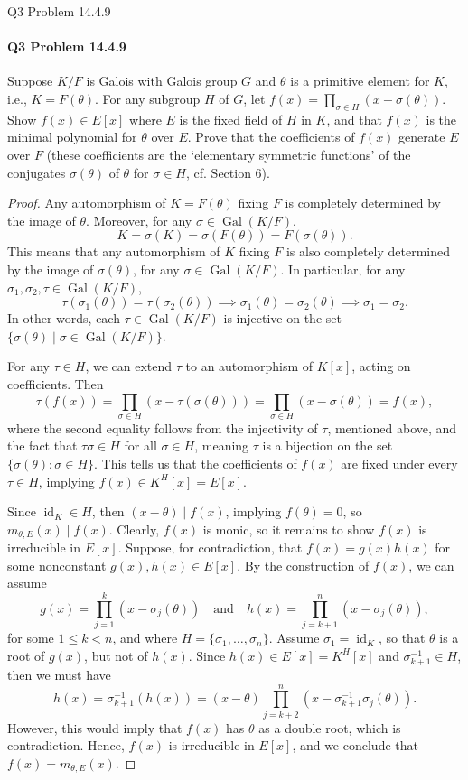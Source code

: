 \documentclass[12pt]{article}
\newenvironment{fullbox}{\begin{lrbox}{\savefullbox}\begin{minipage}{\dimexpr\textwidth-2\fboxsep\relax}}{\end{minipage}\end{lrbox}\begin{center}\framebox[\textwidth]{\usebox{\savefullbox}}\end{center}}
\newenvironment{pbox}[1][]{\begin{fullbox}\ifx#1\empty\else\paragraph{#1}\fi}{\end{fullbox}}
\newcommand{\isp}[1]{\quad\text{#1}\quad}
\newcommand{\<}{\langle}
\renewcommand{\>}{\rangle}
\DeclareMathOperator{\id}{id}
\DeclareMathOperator{\Gal}{Gal}
\begin{document}
\newpage
\begin{pbox}[Q3 Problem 14.4.9]
    Suppose $K/F$ is Galois with Galois group $G$ and $\theta$ is a primitive element for $K$, i.e., $K = F(\theta)$. For any subgroup $H$ of $G$, let $f(x) = \prod_{\sigma \in H}(x - \sigma(\theta))$. Show $f(x) \in E[x]$ where $E$ is the fixed field of $H$ in $K$, and that $f(x)$ is the minimal polynomial for $\theta$ over $E$. Prove that the coefficients of $f(x)$ generate $E$ over $F$ (these coefficients are the `elementary symmetric functions' of the conjugates $\sigma(\theta)$ of $\theta$ for $\sigma \in H$, cf. Section 6).
\end{pbox}

\begin{proof}
    Any automorphism of $K = F(\theta)$ fixing $F$ is completely determined by the image of $\theta$. Moreover, for any $\sigma \in \Gal(K/F)$,
    \[
        K = \sigma(K) = \sigma(F(\theta)) = F(\sigma(\theta)).
    \]
    This means that any automorphism of $K$ fixing $F$ is also completely determined by the image of $\sigma(\theta)$, for any $\sigma \in \Gal(K/F)$. In particular, for any $\sigma_1, \sigma_2, \tau \in \Gal(K/F)$,
    \[
        \tau(\sigma_1(\theta)) = \tau(\sigma_2(\theta)) \implies \sigma_1(\theta) = \sigma_2(\theta) \implies \sigma_1 = \sigma_2.
    \]
    In other words, each $\tau \in \Gal(K/F)$ is injective on the set $\{\sigma(\theta) \mid \sigma \in \Gal(K/F)\}$.

    For any $\tau \in H$, we can extend $\tau$ to an automorphism of $K[x]$, acting on coefficients. Then
    \[
        \tau(f(x)) = \prod_{\sigma \in H} (x - \tau(\sigma(\theta))) = \prod_{\sigma \in H} (x - \sigma(\theta)) = f(x),
    \]
    where the second equality follows from the injectivity of $\tau$, mentioned above, and the fact that $\tau\sigma \in H$ for all $\sigma \in H$, meaning $\tau$ is a bijection on the set $\{\sigma(\theta) : \sigma \in H\}$. This tells us that the coefficients of $f(x)$ are fixed under every $\tau \in H$, implying $f(x) \in K^H[x] = E[x]$.

    Since $\id_K \in H$, then $(x - \theta) \mid f(x)$, implying $f(\theta) = 0$, so $m_{\theta, E}(x) \mid f(x)$. Clearly, $f(x)$ is monic, so it remains to show $f(x)$ is irreducible in $E[x]$. Suppose, for contradiction, that $f(x) = g(x)h(x)$ for some nonconstant $g(x), h(x) \in E[x]$. By the construction of $f(x)$, we can assume
    \[
        g(x) = \prod_{j=1}^{k} (x - \sigma_j(\theta)) \isp{and} h(x) = \prod_{j=k+1}^{n} (x - \sigma_j(\theta)),
    \]
    for some $1 \leq k < n$, and where $H = \{\sigma_1, \dots, \sigma_n\}$. Assume $\sigma_1 = \id_K$, so that $\theta$ is a root of $g(x)$, but not of $h(x)$. Since $h(x) \in E[x] = K^H[x]$ and $\sigma_{k+1}^{-1} \in H$, then we must have
    \[
        h(x) = \sigma_{k+1}^{-1}(h(x)) = (x - \theta)\prod_{j=k+2}^{n} (x - \sigma_{k+1}^{-1}\sigma_j(\theta)).
    \]
    However, this would imply that $f(x)$ has $\theta$ as a double root, which is contradiction. Hence, $f(x)$ is irreducible in $E[x]$, and we conclude that $f(x) = m_{\theta, E}(x)$.


\end{proof}
\end{document}
